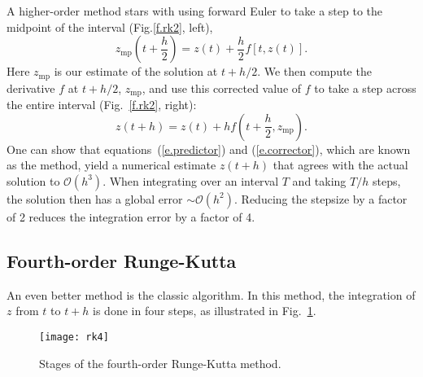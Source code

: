 A higher-order method stars with using forward Euler to take a step to the midpoint of the interval (Fig.\ref{f.rk2}, left),
\begin{equation}\label{e.predictor}
z_{\mathrm{mp}}\left(t+\frac{h}{2}\right) = z(t) + \frac{h}{2}f[t,z(t)].
\end{equation}
Here $z_{\mathrm{mp}}$ is our estimate of the solution at $t+h/2$.
We then compute the derivative $f$ at $t+h/2$, $z_{\mathrm{mp}}$, and use this corrected value of $f$ to take a step across the entire interval (Fig.~\ref{f.rk2}, right):
\begin{equation}\label{e.corrector}
z(t+h) = z(t) + h f\left(t+\frac{h}{2},z_{\mathrm{mp}}\right).
\end{equation}
One can show that equations~(\ref{e.predictor}) and (\ref{e.corrector}), which are known as the 
 method, yield a numerical estimate $z(t+h)$ that agrees with the actual solution to $\mathcal{O}(h^{3})$. When integrating over an interval $T$ and taking $T/h$ steps, the solution then has a global error $\sim\mathcal{O}(h^{2})$. Reducing the stepsize by a factor of 2 reduces the integration error by a factor of 4.

\subsection{Fourth-order Runge-Kutta}

An even better method is the classic  algorithm. In this method, the integration of $z$ from $t$ to $t+h$ is done in four steps, as illustrated in Fig.~\ref{f.rk4}.

\begin{figure}
\texttt{[image: rk4]}
\caption[The fourth-order Runge-Kutta method]{\label{f.rk4}
Stages of the fourth-order Runge-Kutta method.}
\end{figure}

